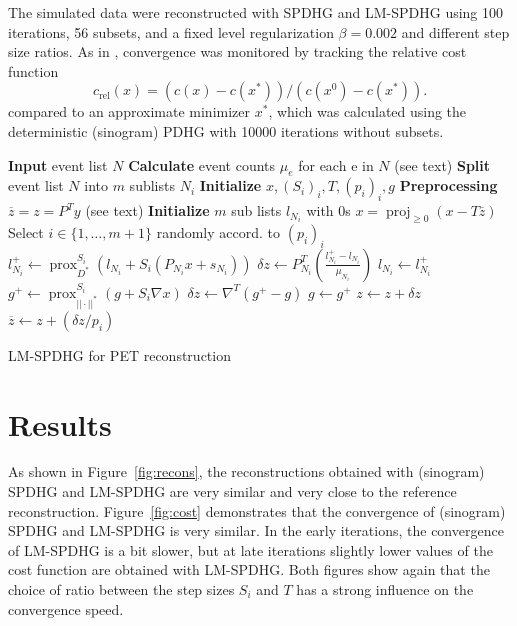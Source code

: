 \documentclass{IEEEtran}
\DeclareMathOperator{\proj}{proj}
\DeclareMathOperator{\prox}{prox}
\begin{document}
The simulated data were reconstructed with SPDHG and LM-SPDHG using 100 iterations, 56 subsets,
and a fixed level regularization $\beta = 0.002$ and different step size ratios.
As in \cite{Ehrhardt2019}, convergence was monitored by tracking the relative cost function
\[ c_\text{rel}(x) = (c(x) - c(x^*)) / (c(x^0) - c(x^*)). \]
compared to an approximate minimizer $x^*$,
which was calculated using the deterministic (sinogram) PDHG with 10000 iterations without subsets.


\begin{algorithm}[t]
\begin{algorithmic}[1]
\footnotesize
\State \textbf{Input} event list $N$
\State \textbf{Calculate} event counts $\mu_e$ for each e in $N$ (see text)
\State \textbf{Split} event list $N$ into $m$ sublists $N_i$
\State \textbf{Initialize} $x,(S_i)_i,T,(p_i)_i,g$
\State \textbf{Preprocessing} $\overline{z} = z = P^T y$ (see text)
\State \textbf{Initialize} $m$ sub lists $l_{N_i}$ with 0s
\Repeat
	\State $x = \proj_{\geq 0} (x - T \overline{z})$
	\State Select $i \in \{1,\ldots,m+1\}$ randomly accord. to $(p_i)_i$
	  \State $l_{N_i}^+ \gets \prox_{D^*}^{S_i} \left( l_{N_i} + S_i \left(P_{N_i} x + s_{N_i} \right) \right)$
	  \State $\delta z \gets P_{N_i}^T \left(\frac{l_{N_i}^+ - l_{N_i}}{\mu_{N_i}}\right)$
	  \State $l_{N_i} \gets l_{N_i}^+$
  \Else
	  \State $g^+ \gets \prox_{||\cdot||^*}^{S_i} \left( g + S_i \nabla x \right)$
	  \State $\delta z \gets \nabla^T \left(g^+ - g\right)$
	  \State $g \gets g^+$
  \EndIf
	\State $z \gets z + \delta z$
	\State $\overline{z} \gets  z + (\delta z/p_i)$
\State {}
\end{algorithmic}
\caption{LM-SPDHG for PET reconstruction}
\label{alg:lmspdhg}
\end{algorithm}


\section{Results}

As shown in Figure~\ref{fig:recons}, the reconstructions obtained with (sinogram) SPDHG and LM-SPDHG
are very similar and very close to the reference reconstruction.
Figure~\ref{fig:cost} demonstrates that the convergence of (sinogram) SPDHG and
LM-SPDHG is very similar. In the early iterations, the convergence of LM-SPDHG is a bit slower, but
at late iterations slightly lower values of the cost function are obtained with LM-SPDHG.
Both figures show again that the choice of ratio between the step sizes $S_i$ and $T$ has
a strong influence on the convergence speed.
\end{document}
